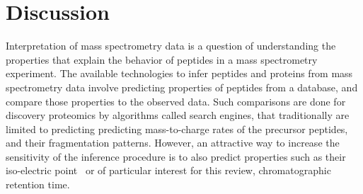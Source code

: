 \documentclass[a4paper]{article}
\begin{document}





\section{Discussion}

Interpretation of mass spectrometry data is a question of
understanding the properties that explain the behavior of peptides in
a mass spectrometry experiment. The available technologies to infer
peptides and proteins from mass spectrometry data involve predicting
properties of peptides from a database, and compare those properties to
the observed data. Such comparisons are done for discovery proteomics
by algorithms called search engines, that traditionally are limited to
predicting predicting mass-to-charge rates of the precursor peptides,
and their fragmentation patterns. However, an attractive way to
increase the sensitivity of the inference procedure is to also predict
properties such as their iso-electric point~\cite{branca2014hirief} or
of particular interest for this review, chromatographic retention
time\cite{cerqueira2010mude}. 
\end{document}
